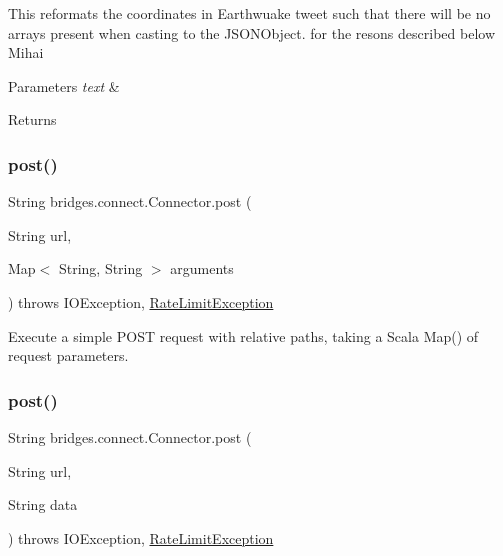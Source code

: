 This reformats the coordinates in Earthwuake tweet such that there will be no arrays present when casting to the J\+S\+O\+N\+Object. for the resons described below Mihai 
\begin{DoxyParams}{Parameters}
{\em text} & \\
\hline
\end{DoxyParams}
\begin{DoxyReturn}{Returns}

\end{DoxyReturn}
\mbox{\label{classbridges_1_1connect_1_1_connector_a88e465aed707d59b96958dcc946ff6b4}} 
\subsubsection{\texorpdfstring{post()}{post()}\hspace{0.1cm}{\footnotesize\ttfamily [1/2]}}
{\footnotesize\ttfamily String bridges.\+connect.\+Connector.\+post (\begin{DoxyParamCaption}\item[{String}]{url,  }\item[{Map$<$ String, String $>$}]{arguments }\end{DoxyParamCaption}) throws I\+O\+Exception, \mbox{\hyperlink{classbridges_1_1validation_1_1_rate_limit_exception}{Rate\+Limit\+Exception}}}

Execute a simple P\+O\+ST request with relative paths, taking a Scala Map() of request parameters. \mbox{\label{classbridges_1_1connect_1_1_connector_a4b8978743a8c230b86500f5a00cb2697}} 
\subsubsection{\texorpdfstring{post()}{post()}\hspace{0.1cm}{\footnotesize\ttfamily [2/2]}}
{\footnotesize\ttfamily String bridges.\+connect.\+Connector.\+post (\begin{DoxyParamCaption}\item[{String}]{url,  }\item[{String}]{data }\end{DoxyParamCaption}) throws I\+O\+Exception, 		\mbox{\hyperlink{classbridges_1_1validation_1_1_rate_limit_exception}{Rate\+Limit\+Exception}}}

